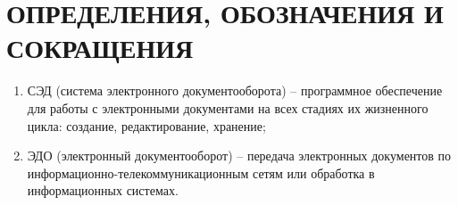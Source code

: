 \section*{ОПРЕДЕЛЕНИЯ, ОБОЗНАЧЕНИЯ И СОКРАЩЕНИЯ}

\begin{enumerate}
	\item СЭД (система электронного документооборота) -- программное обеспечение для работы с электронными документами на всех стадиях их жизненного цикла: создание, редактирование, хранение;
	
	\item ЭДО (электронный документооборот) -- передача электронных документов по информационно-телекоммуникационным сетям или обработка в информационных системах.
\end{enumerate}

\clearpage